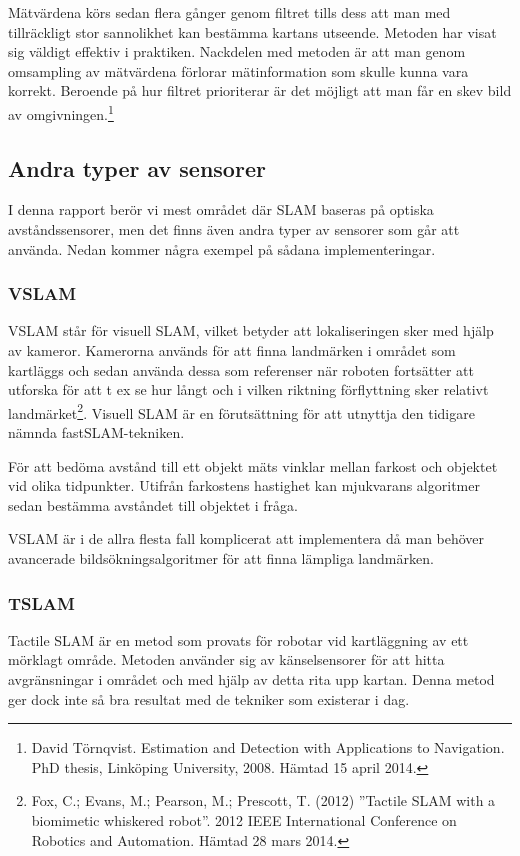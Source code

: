 \documentclass[a4paper,12pt,fleqn]{article}
\begin{document}
Mätvärdena körs sedan flera gånger genom filtret tills dess att man med tillräckligt stor sannolikhet kan bestämma kartans utseende. Metoden har visat sig väldigt effektiv i praktiken. Nackdelen med metoden är att man genom omsampling av mätvärdena förlorar mätinformation som skulle kunna vara korrekt. Beroende på hur filtret prioriterar är det möjligt att man får en skev bild av omgivningen.\footnote{David Törnqvist. Estimation and Detection with Applications to Navigation. PhD thesis, Linköping University, 2008. Hämtad 15 april 2014.}

\subsection{Andra typer av sensorer}

I denna rapport berör vi mest området där SLAM baseras på optiska avståndssensorer, men det finns även andra typer av sensorer som går att använda. Nedan kommer några exempel på sådana implementeringar.

\subsubsection{VSLAM}

VSLAM står för visuell SLAM, vilket betyder att lokaliseringen sker med hjälp av kameror. Kamerorna används för att finna landmärken i området som kartläggs och sedan använda dessa som referenser när roboten fortsätter att utforska för att t ex se hur långt och i vilken riktning förflyttning sker relativt landmärket\footnote{Fox, C.; Evans, M.; Pearson, M.; Prescott, T. (2012) ''Tactile SLAM with a biomimetic whiskered robot''. 2012 IEEE International Conference on Robotics and Automation. Hämtad 28 mars 2014.}. Visuell SLAM är en förutsättning för att utnyttja den tidigare nämnda fastSLAM-tekniken. 

För att bedöma avstånd till ett objekt mäts vinklar mellan farkost och objektet vid olika tidpunkter. Utifrån farkostens hastighet kan mjukvarans algoritmer sedan bestämma avståndet till objektet i fråga. 

VSLAM är i de allra flesta fall komplicerat att implementera då man behöver avancerade bildsökningsalgoritmer för att finna lämpliga landmärken. 

\subsubsection{TSLAM}
Tactile SLAM är en metod som provats för robotar vid kartläggning av ett mörklagt område. Metoden använder sig av känselsensorer för att hitta avgränsningar i området och med hjälp av detta rita upp kartan. Denna metod ger dock inte så bra resultat med de tekniker som existerar i dag.
\end{document}
